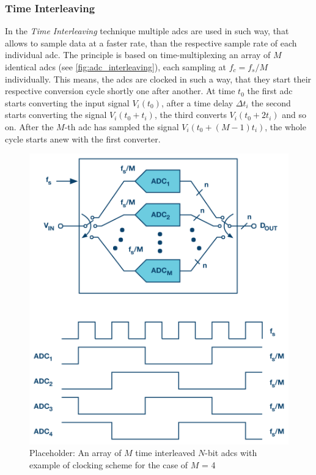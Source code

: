 \subsubsection*{Time Interleaving}\label{sssec:time-interleaving}
In the \textit{Time Interleaving} technique multiple \glspl{adc} are used in such way, that allows to sample data at a faster rate, than the respective sample rate of each individual \gls{adc}. The principle is based on time-multiplexing an array of $M$ identical \glspl{adc} (see \autoref{fig:adc_interleaving}), each sampling at $f_c = f_s/M$ individually. This means, the \glspl{adc} are clocked in such a way, that they start their respective conversion cycle shortly one after another. At time $t_0$ the first \gls{adc} starts converting the input signal $V_i(t_0)$, after a time delay $\Delta t_i$ the second starts converting the signal $V_i(t_0 + t_i)$, the third converts $V_i(t_0 + 2t_i)$ and so on. After the $M$-th \gls{adc} has sampled the signal $V_i(t_0 + (M-1)t_i)$, the whole cycle starts anew with the first converter. \cite{mangrob}
\begin{figure}[tbh]
	\centering
	\includegraphics[width = \textwidth]{chap/02-theory/img/adc_inter}
	\caption[Time Interleaving]{Placeholder: An array of $M$ time interleaved $N$-bit \glspl{adc} with example of clocking scheme for the case of $M$ = 4 \cite{mangrob}}
	\label{fig:adc_interleaving}
\end{figure}
